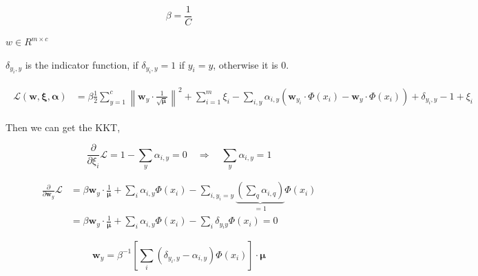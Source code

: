 \documentclass{article}
\begin{document}
\begin{equation}
    \beta = \frac{1}{C}
\end{equation}


$w \in R^{m \times c}$

$\delta_{y_i, y}$ is the indicator function, if $\delta_{y_i, y} = 1$ if $y_i = y$, otherwise it is 0.

\begin{align}
    \begin{aligned}
        \mathcal{L}(\mathbf{w}, \boldsymbol{\xi}, \bm{\alpha})
         & = \beta \frac{1}{2}  \sum_{y=1}^{c} {\left\|\mathbf{w}_{y} \cdot \frac{1}{\sqrt{\bm{\mu}}} \right\|^{2}}
        + \sum_{i=1}^{m} \xi_{i}
        - \sum_{i, y} \alpha_{i, y}\left(\mathbf{w}_{y_{i}} \cdot \Phi\left(x_{i}\right)-\mathbf{w}_{y} \cdot \Phi\left(x_{i}\right)\right) + \delta_{y_i, y} - 1 + \xi_{i}
    \end{aligned}
\end{align}

Then we can get the KKT,

\begin{equation}
    \frac{\partial}{\partial \xi_{i}} \mathcal{L}=1- \sum_{y} \alpha_{i, y}=0 \quad \Rightarrow \quad \sum_{y} \alpha_{i, y} = 1
    \label{eq:2b_xi}
\end{equation}


\begin{equation}
    \begin{aligned}
        \frac{\partial}{\partial \bm{w}_{y}} \mathcal{L} & =
        \beta \bm{w}_{y} \cdot \frac{1}{\bm{\mu}} + \sum_{i} \alpha_{i, y} \Phi({x}_{i})-\sum_{i, y_{i}=y} \underbrace{\left(\sum_{q} \alpha_{i, q}\right)}_{=1} \Phi({x}_{i})          \\
                                                         & =\beta \bm{w}_{y} \cdot \frac{1}{\bm{\mu}} + \sum_{i} \alpha_{i, y} \Phi({x}_{i})- \sum_{i} \delta_{y_{i} y} \Phi({x}_{i})=0
    \end{aligned}
\end{equation}

\begin{equation}
    \bm{w}_{y}=\beta^{-1} \left[\sum_{i}\left(\delta_{y_{i}, y}-\alpha_{i, y}\right) \Phi({x}_{i})\right] \cdot \bm{\mu}
    \label{eq:2b_w}
\end{equation}
\end{document}
